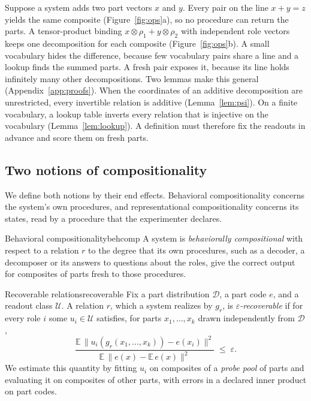 \documentclass[10pt]{article}
\theoremstyle{plain}
\theoremstyle{remark}
\newcommand{\U}{\mathcal{U}}
\newcommand{\D}{\mathcal{D}}
\begin{document}
Suppose a system adds two part vectors $x$ and $y$. Every pair on the line $x + y = z$ yields the same composite (Figure~\ref{fig:ops}a), so no procedure can return the parts. A tensor-product binding $x \otimes \rho_1 + y \otimes \rho_2$ with independent role vectors keeps one decomposition for each composite (Figure~\ref{fig:ops}b). A small vocabulary hides the difference, because few vocabulary pairs share a line and a lookup finds the summed parts. A fresh pair exposes it, because its line holds infinitely many other decompositions. Two lemmas make this general (Appendix~\ref{app:proofs}). When the coordinates of an additive decomposition are unrestricted, every invertible relation is additive (Lemma~\ref{lem:psi}). On a finite vocabulary, a lookup table inverts every relation that is injective on the vocabulary (Lemma~\ref{lem:lookup}). A definition must therefore fix the readouts in advance and score them on fresh parts.

\subsection{Two notions of compositionality}
\label{sec:notions}

We define both notions by their end effects. Behavioral compositionality concerns the system's own procedures, and representational compositionality concerns its states, read by a procedure that the experimenter declares.

\begin{defbox}{Behavioral compositionality}{behcomp}
A system is \emph{behaviorally compositional} with respect to a relation $r$ to the degree that its own procedures, such as a decoder, a decomposer or its answers to questions about the roles, give the correct output for composites of parts fresh to those procedures.
\end{defbox}

\begin{defbox}{Recoverable relations}{recoverable}
Fix a part distribution $\D$, a part code $e$, and a readout class $\U$. A relation $r$, which a system realizes by $g_r$, is \emph{$\varepsilon$-recoverable} if for every role $i$ some $u_i \in \U$ satisfies, for parts $x_1, \ldots, x_k$ drawn independently from $\D$,
\begin{equation}
  \frac{\mathbb{E}\,\lVert u_i(g_r(x_1,\ldots,x_k)) - e(x_i) \rVert^2}{\mathbb{E}\,\lVert e(x) - \mathbb{E}\,e(x) \rVert^2} \;\le\; \varepsilon .
  \label{eq:recover}
\end{equation}
We estimate this quantity by fitting $u_i$ on composites of a \emph{probe pool} of parts and evaluating it on composites of other parts, with errors in a declared inner product on part codes.
\end{defbox}
\end{document}
